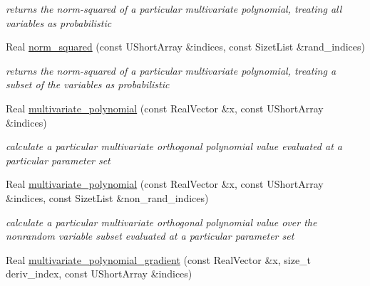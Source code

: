 \begin{DoxyCompactItemize}
\begin{DoxyCompactList}\small\item\em returns the norm-\/squared of a particular multivariate polynomial, treating all variables as probabilistic \end{DoxyCompactList}\item 
Real \hyperlink{classPecos_1_1SharedOrthogPolyApproxData_a93b96870a5d834bf8152cb027ca6f83e}{norm\+\_\+squared} (const U\+Short\+Array \&indices, const Sizet\+List \&rand\+\_\+indices)
\begin{DoxyCompactList}\small\item\em returns the norm-\/squared of a particular multivariate polynomial, treating a subset of the variables as probabilistic \end{DoxyCompactList}\item 
Real \hyperlink{classPecos_1_1SharedOrthogPolyApproxData_a2de07217be9ed3d72ae5c67f96c18773}{multivariate\+\_\+polynomial} (const Real\+Vector \&x, const U\+Short\+Array \&indices)\label{classPecos_1_1SharedOrthogPolyApproxData_a2de07217be9ed3d72ae5c67f96c18773}

\begin{DoxyCompactList}\small\item\em calculate a particular multivariate orthogonal polynomial value evaluated at a particular parameter set \end{DoxyCompactList}\item 
Real \hyperlink{classPecos_1_1SharedOrthogPolyApproxData_a82c66952c58967e65f08cd04f8a9865e}{multivariate\+\_\+polynomial} (const Real\+Vector \&x, const U\+Short\+Array \&indices, const Sizet\+List \&non\+\_\+rand\+\_\+indices)
\begin{DoxyCompactList}\small\item\em calculate a particular multivariate orthogonal polynomial value over the nonrandom variable subset evaluated at a particular parameter set \end{DoxyCompactList}\item 
Real \hyperlink{classPecos_1_1SharedOrthogPolyApproxData_aaf8df35d279fb8bf2cfbd523ac688d75}{multivariate\+\_\+polynomial\+\_\+gradient} (const Real\+Vector \&x, size\+\_\+t deriv\+\_\+index, const U\+Short\+Array \&indices)\label{classPecos_1_1SharedOrthogPolyApproxData_aaf8df35d279fb8bf2cfbd523ac688d75}


\end{DoxyCompactItemize}
